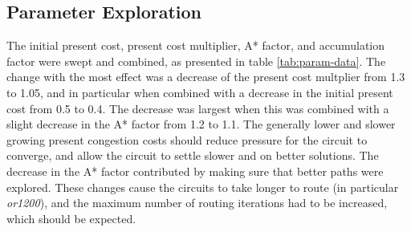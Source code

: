 \documentclass[11pt]{article}
\begin{document}
\subsection{Parameter Exploration}
The initial present cost, present cost multiplier, A* factor, and accumulation factor were swept and combined, as presented in table \ref{tab:param-data}. The change with the most effect was a decrease of the present cost multplier from 1.3 to 1.05, and in particular when combined with a decrease in the initial present cost from 0.5 to 0.4. The decrease was largest when this was combined with a slight decrease in the A* factor from 1.2 to 1.1. The generally lower and slower growing present congestion costs should reduce pressure for the circuit to converge, and allow the circuit to settle slower and on better solutions. The decrease in the A* factor contributed by making sure that better paths were explored. These changes cause the circuits to take longer to route (in particular \emph{or1200}), and the maximum number of routing iterations had to be increased, which should be expected.
\end{document}
